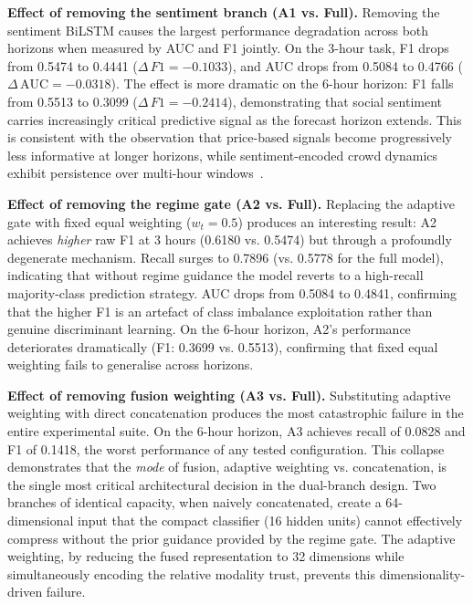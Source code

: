 \documentclass[journal]{IEEEtran}
\newcommand{\delt}[1]{\Delta\,{#1}}
\begin{document}
\textbf{Effect of removing the sentiment branch (A1 vs. Full).}
Removing the sentiment BiLSTM causes the largest performance degradation
across both horizons when measured by AUC and F1 jointly. On the 3-hour task,
F1 drops from 0.5474 to 0.4441 ($\delt{F1} = -0.1033$), and AUC drops from
0.5084 to 0.4766 ($\delt{\mathrm{AUC}} = -0.0318$). The effect is more
dramatic on the 6-hour horizon: F1 falls from 0.5513 to 0.3099 ($\delt{F1}
= -0.2414$), demonstrating that social sentiment carries increasingly
critical predictive signal as the forecast horizon extends. This is consistent
with the observation that price-based signals become progressively less
informative at longer horizons, while sentiment-encoded crowd dynamics exhibit
persistence over multi-hour windows~\cite{Shen2019reddit}.

\textbf{Effect of removing the regime gate (A2 vs. Full).}
Replacing the adaptive gate with fixed equal weighting ($w_t = 0.5$) produces
an interesting result: A2 achieves \textit{higher} raw F1 at 3 hours (0.6180
vs. 0.5474) but through a profoundly degenerate mechanism. Recall surges to
0.7896 (vs. 0.5778 for the full model), indicating that without regime guidance
the model reverts to a high-recall majority-class prediction strategy. AUC
drops from 0.5084 to 0.4841, confirming that the higher F1 is an artefact of
class imbalance exploitation rather than genuine discriminant learning. On the
6-hour horizon, A2's performance deteriorates dramatically (F1: 0.3699 vs.
0.5513), confirming that fixed equal weighting fails to generalise across
horizons.

\textbf{Effect of removing fusion weighting (A3 vs. Full).}
Substituting adaptive weighting with direct concatenation produces the most
catastrophic failure in the entire experimental suite. On the 6-hour horizon,
A3 achieves recall of 0.0828 and F1 of 0.1418, the worst performance of any
tested configuration. This collapse demonstrates that the \textit{mode} of
fusion, adaptive weighting vs. concatenation, is the single most critical
architectural decision in the dual-branch design. Two branches of identical
capacity, when naively concatenated, create a 64-dimensional input that the
compact classifier (16 hidden units) cannot effectively compress without the
prior guidance provided by the regime gate. The adaptive weighting, by reducing
the fused representation to 32 dimensions while simultaneously encoding the
relative modality trust, prevents this dimensionality-driven failure.
\end{document}
